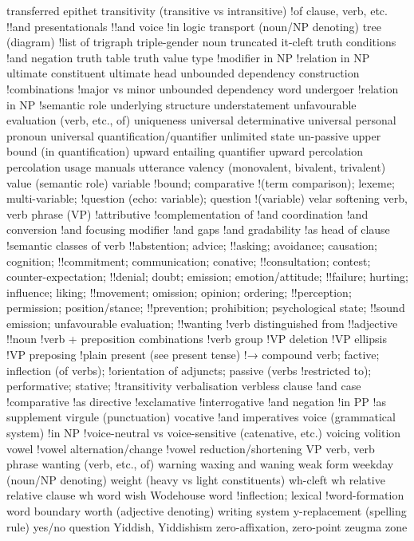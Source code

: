 transferred epithet
transitivity (transitive vs intransitive)
!of clause, verb, etc.
!!and presentationals
!!and voice
!in logic
transport (noun/NP denoting)
tree (diagram)
!list of
trigraph
triple-gender noun
truncated it-cleft
truth conditions
!and negation
truth table
truth value
type
!modifier in NP
!relation in NP
ultimate constituent
ultimate head
unbounded dependency construction
!combinations
!major vs minor
unbounded dependency word
undergoer
!relation in NP
!semantic role
underlying structure
understatement
unfavourable evaluation (verb, etc., of)
uniqueness
universal determinative
universal personal pronoun
universal quantification/quantifier
unlimited state
un-passive
upper bound (in quantification)
upward entailing quantifier
upward percolation percolation
usage manuals
utterance
valency (monovalent, bivalent, trivalent)
value (semantic role)
variable
!bound; comparative
!(term comparison); lexeme; multi-variable;
!question (echo: variable); question
!(variable)
velar softening
verb, verb phrase (VP)
!attributive
!complementation of
!and coordination
!and conversion
!and focusing modifier
!and gaps
!and gradability
!as head of clause
!semantic classes of verb
!!abstention; advice;
!!asking; avoidance; causation; cognition;
!!commitment; communication; conative;
!!consultation; contest; counter-expectation;
!!denial; doubt; emission; emotion/attitude;
!!failure; hurting; influence; liking;
!!movement; omission; opinion; ordering;
!!perception; permission; position/stance;
!!prevention; prohibition; psychological state;
!!sound emission; unfavourable evaluation;
!!wanting
!verb distinguished from
!!adjective
!!noun
!verb + preposition combinations
!verb group
!VP deletion
!VP ellipsis
!VP preposing
!plain present (see present tense)
!→ compound verb; factive; inflection (of verbs);
!orientation of adjuncts; passive (verbs
!restricted to); performative; stative;
!transitivity
verbalisation
verbless clause
!and case
!comparative
!as directive
!exclamative
!interrogative
!and negation
!in PP
!as supplement
virgule (punctuation)
vocative
!and imperatives
voice (grammatical system)
!in NP
!voice-neutral vs voice-sensitive (catenative, etc.)
voicing
volition
vowel
!vowel alternation/change
!vowel reduction/shortening
VP verb, verb phrase
wanting (verb, etc., of)
warning
waxing and waning
weak form
weekday (noun/NP denoting)
weight (heavy vs light constituents)
wh-cleft
wh relative relative clause
wh word
wish
Wodehouse
word
!inflection; lexical
!word-formation
word boundary
worth (adjective denoting)
writing system
y-replacement (spelling rule)
yes/no question
Yiddish, Yiddishism
zero-affixation,
zero-point
zeugma
zone
